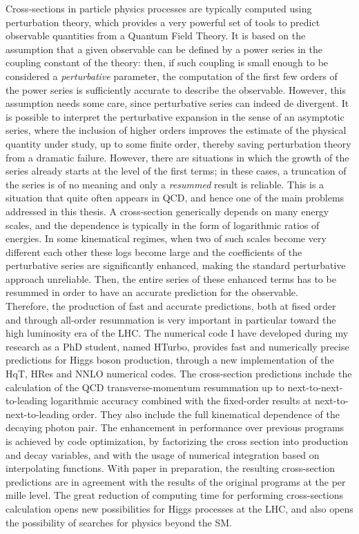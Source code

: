\documentclass[12pt]{article}
\begin{document}
Cross-sections in particle physics processes are typically computed using perturbation theory, which provides a very powerful set of tools to predict observable quantities from a Quantum Field Theory. It is based on the assumption that a given observable can be defined by a power series in the coupling constant of the theory: then, if such coupling is small enough to be considered a \textit{perturbative} parameter, the computation of the first few orders of the power series is sufficiently accurate to describe the observable. However, this assumption needs some care, since perturbative series can indeed de divergent. It is possible to interpret the perturbative expansion in the sense of an asymptotic series, where the inclusion of higher orders improves the estimate of the physical quantity under study, up to some finite order, thereby saving perturbation theory from a dramatic failure. However, there are situations in which the growth of the series already starts at the level of the first terms; in these cases, a truncation of the series is of no meaning and only a \textit{resummed} result is reliable. This is a situation that quite often appears in QCD, and hence one of the main problems addressed in this thesis. A cross-section generically depends on many energy scales, and the dependence is typically in the form of logarithmic ratios of energies. In some kinematical regimes, when two of such scales become very different each other these logs become large and the coefficients of the perturbative series are significantly enhanced, making the standard perturbative approach unreliable. Then, the entire series of these enhanced terms has to be resummed in order to have an accurate prediction for the observable.\\

Therefore, the production of fast and accurate predictions, both at fised order and through all-order resummation is very important in particular toward the high luminosity era of the LHC. The numerical code I have developed during my research as a PhD student, named HTurbo, provides fast and numerically precise predictions for Higgs boson production, through a new implementation of the HqT, HRes and NNLO numerical codes. The cross-section predictions include the calculation of the QCD transverse-momentum resummation up to next-to-next-to-leading logarithmic accuracy combined with the fixed-order results at next-to-next-to-leading order. They also include the full kinematical dependence of the decaying photon pair. The enhancement in performance over previous programs is achieved by code optimization, by factorizing the cross section into production and decay variables, and with the usage of numerical integration based on interpolating functions. With paper in preparation, the resulting cross-section predictions are in agreement with the results of the original programs at the per mille level. The great reduction of computing time for performing cross-sections calculation opens new possibilities for Higgs processes at the LHC, and also opens the possibility of searches for physics beyond the SM.
\end{document}
